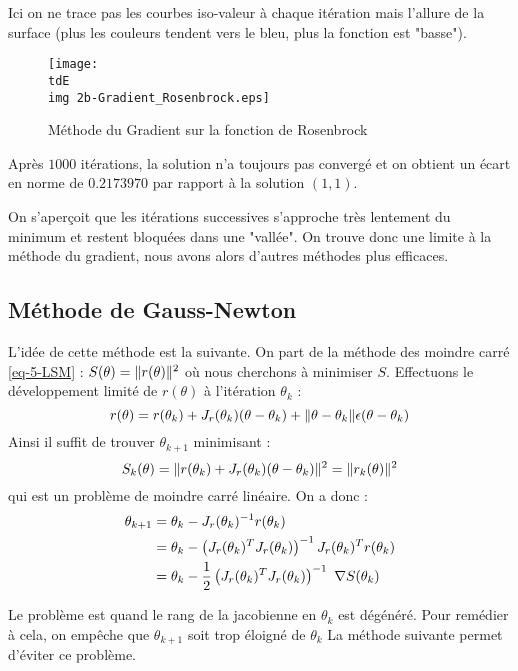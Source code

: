 		Ici on ne trace pas les courbes iso-valeur à chaque itération mais l'allure de la surface (plus les couleurs tendent vers le bleu, plus la fonction est "basse").
		
		\begin{figure}[H]
			\centering
			\texttt{[image: \\tdE\\img 2b-Gradient\_Rosenbrock.eps]}
			\caption{Méthode du Gradient sur la fonction de Rosenbrock}
			\label{img-5-methGradRosen}
		\end{figure}

		Après $1000$ itérations, la solution n'a toujours pas convergé et on obtient un écart en norme de $0.2173970$ par rapport à la solution $(1,1)$.

		On s'aperçoit que les itérations successives s'approche très lentement du minimum et restent bloquées dans une "vallée".
		On trouve donc une limite à la méthode du gradient, nous avons alors d'autres méthodes plus efficaces.

	\subsection{Méthode de Gauss-Newton}

		L'idée de cette méthode est la suivante. On part de la méthode des moindre carré \eqref{eq-5-LSM} : $S(\theta) = \lVert r(\theta) \rVert^2$ où nous cherchons à minimiser $S$. Effectuons le développement limité de $r(\theta)$ à l'itération $\theta_k$ :
		$$
			r(\theta) = r(\theta_k) + J_r(\theta_k)(\theta-\theta_k) + \lVert \theta-\theta_k \rVert \epsilon(\theta-\theta_k)
		$$
		Ainsi il suffit de trouver $\theta_{k+1}$ minimisant :
		$$
			S_k(\theta) = \lVert r(\theta_k) + J_r(\theta_k) (\theta-\theta_k) \rVert^2
						= \lVert r_k(\theta) \rVert^2
		$$
		qui est un problème de moindre carré linéaire.
		On a donc :
		\begin{align*}
			\theta_{k+1} 
						&= \theta_k - J_r(\theta_k)^{-1}  r(\theta_k)	\\
						&= \theta_k - \left( J_r(\theta_k)^T J_r(\theta_k) \right)^{-1} J_r(\theta_k)^T r(\theta_k)	\\
						&= \theta_k - \frac{1}{2} \left( J_r(\theta_k)^T J_r(\theta_k)  \right)^{-1} ~\nabla S(\theta_k)
		\end{align*}

		Le problème est quand le rang de la jacobienne en $\theta_k$ est dégénéré. Pour remédier à cela, on empêche que $\theta_{k+1}$ soit trop éloigné de $\theta_k$
		La méthode suivante permet d'éviter ce problème.

